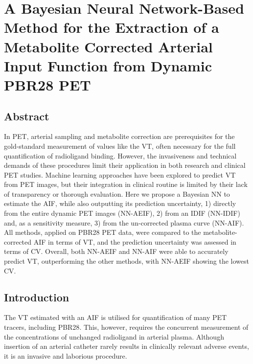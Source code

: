 \chapter{A Bayesian Neural Network-Based Method for the Extraction of a Metabolite Corrected Arterial Input Function from Dynamic PBR28 PET} \label{sec:a_bayesian_neural_network-based_method_for_the_extraction_of_a_metabolite_corrected_arterial_input_function_from_dynamic_pbr28_pet_appendix}
    \newpage

    \section{Abstract} \label{sec:a_bayesian_neural_network-based_method_for_the_extraction_of_a_metabolite_corrected_arterial_input_function_from_dynamic_pbr28_pet_appendix_abstract}
        In \gls{PET}, arterial sampling and metabolite correction are prerequisites for the gold-standard measurement of values like the \gls{VT}, often necessary for the full quantification of radioligand binding. However, the invasiveness and technical demands of these procedures limit their application in both research and clinical \gls{PET} studies. Machine learning approaches have been explored to predict \gls{VT} from \gls{PET} images, but their integration in clinical routine is limited by their lack of transparency or thorough evaluation. Here we propose a Bayesian \gls{NN} to estimate the \gls{AIF}, while also outputting its prediction uncertainty, 1) directly from the entire dynamic \gls{PET} images (\gls{NN}-\gls{AE}\gls{IF}), 2) from an \gls{IDIF} (\gls{NN}-\gls{IDIF}) and, as a sensitivity measure, 3) from the un-corrected plasma curve (\gls{NN}-\gls{AIF}). All methods, applied on \gls{PBR28} \gls{PET} data, were compared to the metabolite-corrected \gls{AIF} in terms of \gls{VT}, and the prediction uncertainty was assessed in terms of \gls{CV}. Overall, both \gls{NN}-\gls{AE}\gls{IF} and \gls{NN}-\gls{AIF} were able to accurately predict \gls{VT}, outperforming the other methods, with \gls{NN}-\gls{AE}\gls{IF} showing the lowest \gls{CV}.

    \section{Introduction} \label{sec:a_bayesian_neural_network-based_method_for_the_extraction_of_a_metabolite_corrected_arterial_input_function_from_dynamic_pbr28_pet_appendix_introduction}
        The \gls{VT} estimated with an \gls{AIF} is utilised for quantification of many \gls{PET} tracers, including \gls{PBR28}. This, however, requires the concurrent measurement of the concentrations of unchanged radioligand in arterial plasma. Although insertion of an arterial catheter rarely results in clinically relevant adverse events, it is an invasive and laborious procedure. 
    
